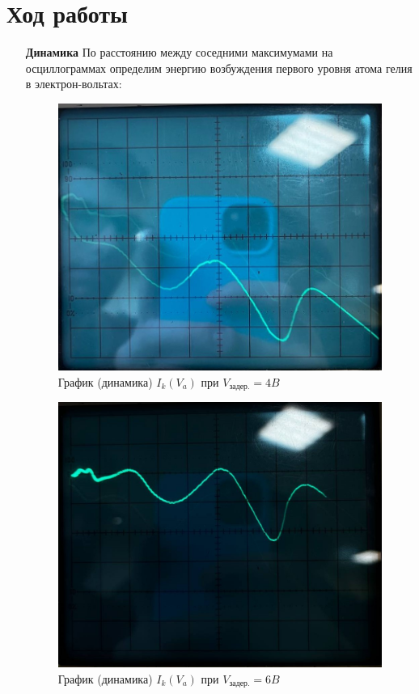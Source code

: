 \documentclass[a4paper, 12pt]{article}%
\begin{document}
\section{Ход работы}
\begin{itemize}

\item [\textbf{Динамика}] По расстоянию между соседними максимумами на осциллограммах определим энергию возбуждения первого уровня атома гелия в электрон-вольтах:

\begin{figure}[!h]
    \centering
    \includegraphics[scale=0.45]{graph1.jpg}
    \caption{График (динамика) $I_k(V_a)$ при $V_{\text{задер.}} = 4 B$}
    \label{graph:1}
\end{figure}

\newpage

\begin{figure}[!h]
    \centering
    \includegraphics[scale=0.39]{graph2.jpg}
    \caption{График (динамика) $I_k(V_a)$ при $V_{\text{задер.}} = 6 B$}
    \label{graph:2}
\end{figure}


\end{itemize}
\end{document}
